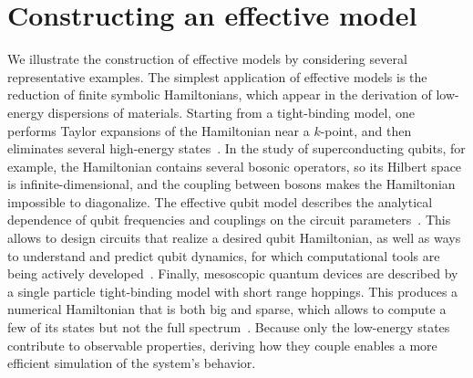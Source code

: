\section{Constructing an effective model}

We illustrate the construction of effective models by considering several representative examples.
The simplest application of effective models is the reduction of finite symbolic Hamiltonians, which appear in the derivation of low-energy dispersions of materials.
Starting from a tight-binding model, one performs Taylor expansions of the Hamiltonian near a $k$-point, and then eliminates several high-energy states~\cite{Luttinger_1955,McCann_2013}.
In the study of superconducting qubits, for example, the Hamiltonian contains several bosonic operators, so its Hilbert space is infinite-dimensional, and the coupling between bosons makes the Hamiltonian impossible to diagonalize.
The effective qubit model describes the analytical dependence of qubit frequencies and couplings on the circuit parameters~\cite{Blais_2004,Zhu_2013,Krantz_2019,Li_2020,Blais_2021,Sete_2021}.
This allows to design circuits that realize a desired qubit Hamiltonian, as well as ways to understand and predict qubit dynamics, for which computational tools are being actively developed~\cite{Groszkowski_2021,Chitta_2022,Li_2022}.
Finally, mesoscopic quantum devices are described by a single particle tight-binding model with short range hoppings.
This produces a numerical Hamiltonian that is both big and sparse, which allows to compute a few of its states but not the full spectrum~\cite{Melo_2023}.
Because only the low-energy states contribute to observable properties, deriving how they couple enables a more efficient simulation of the system's behavior.


